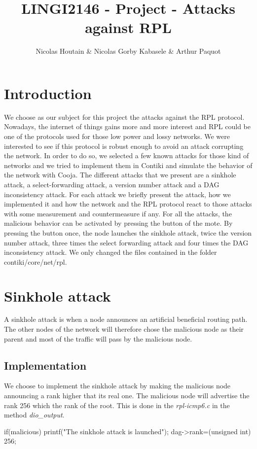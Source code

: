 \documentclass{report}
\title{LINGI2146 - Project - Attacks against RPL}
\author{Nicolas Houtain \& Nicolas Gorby Kabasele \& Arthur Paquot}
\begin{document}
\maketitle
\section{Introduction}
We choose as our subject for this project the attacks against the RPL
protocol. Nowadays, the internet of things gains more and more interest
and RPL could be one of the protocols used for those low power and lossy
networks. We were interested to see if this protocol is robust enough to
avoid an attack corrupting the network. In order to do so, we selected a
few known attacks for those kind of networks and we tried to implement
them in Contiki and simulate the behavior of the network with Cooja. The
different attacks that we present are a sinkhole attack, a
select-forwarding attack, a version number attack and a DAG
inconsistency attack. For each attack we briefly present the attack, how
we implemented it and how the network and the RPL protocol react to
those attacks with some measurement and countermeasure if any. For all
the attacks, the malicious behavior can be activated by pressing the
button of the mote. By pressing the button once, the node launches the
sinkhole attack, twice the version number attack, three times the select
forwarding attack and four times the DAG inconsistency attack. We only
changed the files contained in the folder contiki/core/net/rpl.

\section{Sinkhole attack}
A sinkhole attack is when a node announces an artificial beneficial
routing path. The other nodes of the network will therefore chose the
malicious node as their parent and most of the traffic will pass by the
malicious node.


\subsection*{Implementation}
We choose to implement the sinkhole attack by making the malicious node
announcing a rank higher that its real one. The malicious node will
advertise the rank 256 which the rank of the root. This is done in the
\textit{rpl-icmp6.c} in the method \textit{dio\_output}.


\begin{myc}
if(malicious){
	printf("The sinkhole attack is launched\n");
	dag->rank=(unsigned int) 256;
}
\end{myc}
\end{document}
